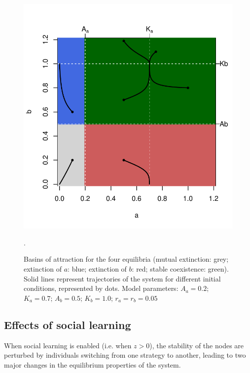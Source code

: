 \documentclass[review,authoryear]{elsarticle}
\begin{document}
\begin{figure}[h!]
  \centering
      \includegraphics[width=1\textwidth]{./figures/figure2.pdf}
  \caption{Basins of attraction for the four equilibria (mutual extinction: grey; extinction of $a$: blue; extinction of $b$: red; stable coexistence: green). Solid lines represent trajectories of the system for different initial conditions, represented by dots. Model parameters: $A_a=0.2$; $K_a=0.7$; $A_b=0.5$; $K_b=1.0$; $r_a=r_b=0.05$}.
    \label{fig:NoTransmissionBasin}
\end{figure}

\subsection{Effects of social learning}

When social learning is enabled (i.e. when $z>0$), the stability of the nodes are perturbed by individuals switching from one strategy to another, leading to two major changes in the equilibrium properties of the system. 
\end{document}
